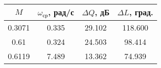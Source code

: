 \begin{tabular}{|c|c|c|c|}
\hline
   $M$ &  $\omega_{ср}$, рад/с &  $\Delta Q$, дБ &  $\Delta L$, град. \\
\hline
0.3071 &                 0.335 &          29.102 &            118.600 \\
  0.61 &                 0.324 &          24.503 &             98.414 \\
0.6119 &                 7.489 &          13.362 &             74.939 \\
\hline
\end{tabular}
